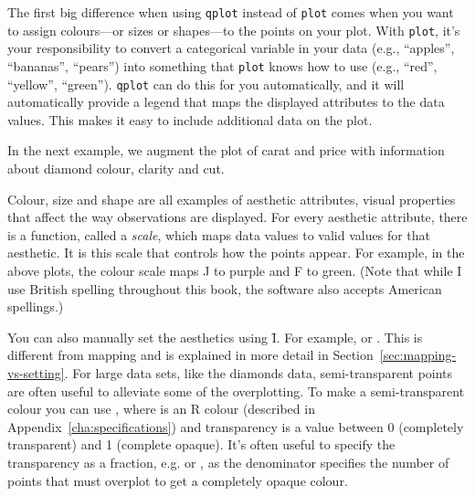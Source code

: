The first big difference when using {\tt qplot} instead of {\tt plot} comes when you want to assign colours---or sizes or shapes---to the points on your plot.  With {\tt plot}, it's your responsibility to convert a categorical variable in your data (e.g., ``apples'', ``bananas'', ``pears'') into something that {\tt plot} knows how to use (e.g., ``red'', ``yellow'', ``green'').  {\tt qplot} can do this for you automatically, and it will automatically provide a legend that maps the displayed attributes to the data values.  This makes it easy to include additional data on the plot.  

In the next example, we augment the plot of carat and price with information about diamond colour, clarity and cut.

% 


Colour, size and shape are all examples of aesthetic attributes, visual properties that affect the way observations are displayed.  For every aesthetic attribute, there is a function, called a \emph{scale}, which maps data values to valid values for that aesthetic.  It is this scale that controls how the points appear.  For example, in the above plots, the colour scale maps J to purple and F to green. (Note that while I use British spelling throughout this book, the software also accepts American spellings.)

You can also manually set the aesthetics using \f{I}.  For example,  or .  This is different from mapping and is explained in more detail in Section~\ref{sec:mapping-vs-setting}.  For large data sets, like the diamonds data, semi-transparent points are often useful to alleviate some of the overplotting.  To make a semi-transparent colour you can use , where  is an R colour (described in Appendix~\ref{cha:specifications}) and transparency is a value between 0 (completely transparent) and 1 (complete opaque).  It's often useful to specify the transparency as a fraction, e.g.  or , as the denominator specifies the number of points that must overplot to get a completely opaque colour.


